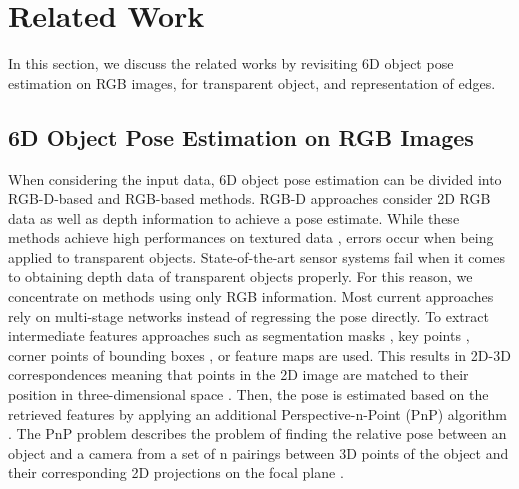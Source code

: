 \section{Related Work}
\vspace{-3mm}
In this section, we discuss the related works by revisiting 6D object pose estimation on RGB images, for transparent object, and representation of edges.

\subsection{6D Object Pose Estimation on RGB Images}
When considering the input data, 6D object pose estimation can be divided into RGB-D-based and RGB-based methods.
RGB-D approaches consider 2D RGB data as well as depth information to achieve a pose estimate. 
While these methods achieve high performances on textured data \cite{pvn3d, g2l, densefusion}, errors occur when being applied to transparent objects. 
State-of-the-art sensor systems fail when it comes to obtaining depth data of transparent objects properly. For this reason, we concentrate on methods using only RGB information.
Most current approaches rely on multi-stage networks instead of regressing the pose directly.
To extract intermediate features approaches such as segmentation masks \cite{Hu_2020_CVPR}, key points \cite{kundu2019object}, corner points of bounding boxes \cite{rad2017bb8}, or feature maps \cite{gdrnet} are used. This results in 2D-3D correspondences meaning that points in the 2D image are matched to their position in three-dimensional space \cite{huang1994motion}.
Then, the pose is estimated based on the retrieved features by applying an additional Perspective-n-Point (PnP) algorithm \cite{pavlakos20176, tjaden2017real}. The PnP problem describes the problem of finding the relative pose between an object and a camera from a set of n pairings between 3D points of the object and their corresponding 2D projections on the focal plane \cite{wu2006pnp}. 



